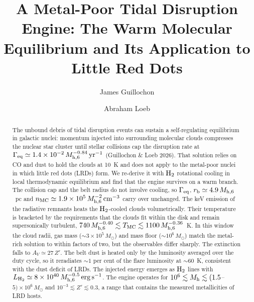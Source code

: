\documentclass[twocolumn,pdftex]{aastex701}
\begin{document}
\title{A Metal-Poor Tidal Disruption Engine: The Warm Molecular Equilibrium and Its Application to Little Red Dots}


\author[0000-0002-9809-8215]{James Guillochon}

\author[0000-0003-4330-287X]{Abraham Loeb}

\begin{abstract}
The unbound debris of tidal disruption events can sustain a self-regulating equilibrium in galactic nuclei: momentum injected into surrounding molecular clouds compresses the nuclear star cluster until stellar collisions cap the disruption rate at $\Gamma_{\rm eq}\simeq1.4\times10^{-2}\,M_{\rm h,6}^{-0.84}\,{\rm yr^{-1}}$ (Guillochon \& Loeb 2026). That solution relies on CO and dust to hold the clouds at 10~K and does not apply to the metal-poor nuclei in which little red dots (LRDs) form. We re-derive it with ${\rm H_2}$ rotational cooling in local thermodynamic equilibrium and find that the engine survives on a warm branch. The collision cap and the belt radius do not involve cooling, so $\Gamma_{\rm eq}$, $r_{\rm b}\simeq4.9\,M_{\rm h,6}$~pc and $n_{\rm MC}\simeq1.9\times10^{5}\,M_{\rm h,6}^{-2}\,{\rm cm^{-3}}$ carry over unchanged. The keV emission of the radiative remnants heats the ${\rm H_2}$-cooled clouds volumetrically. Their temperature is bracketed by the requirements that the clouds fit within the disk and remain supersonically turbulent, $740\,M_{\rm h,6}^{-0.40}\lesssim T_{\rm MC}\lesssim1100\,M_{\rm h,6}^{-0.36}$~K. In this window the cloud radii, gas mass ($\sim3\times10^{5}\,M_{\odot}$) and mass floor ($\sim10^{6}\,M_{\odot}$) match the metal-rich solution to within factors of two, but the observables differ sharply. The extinction falls to $A_V\simeq27\,Z'$. The belt dust is heated only by the luminosity averaged over the duty cycle, so it reradiates $\sim1$ per cent of the flare luminosity at $\sim60$~K, consistent with the dust deficit of LRDs. The injected energy emerges as ${\rm H_2}$ lines with $L_{\rm H_2}\simeq8\times10^{40}\,M_{\rm h,6}^{-0.5}\,{\rm erg\,s^{-1}}$. The engine operates for $10^{6}\lesssim M_{\rm h}\lesssim(1.5$--$5)\times10^{6}\,M_{\odot}$ and $10^{-3}\lesssim Z'\lesssim0.3$, a range that contains the measured metallicities of LRD hosts.
\end{abstract}
\end{document}
